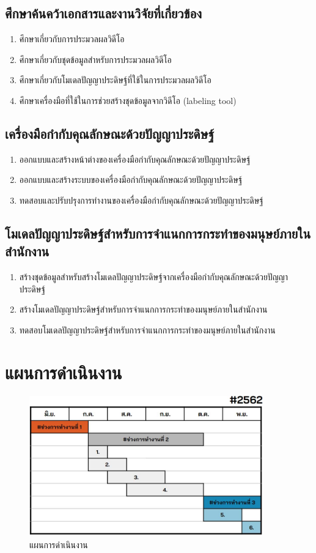 \subsection*{ศึกษาค้นคว้าเอกสารและงานวิจัยที่เกี่ยวข้อง}
\begin{enumerate}\setlength\itemsep{-0.25em}
	\item ศึกษาเกี่ยวกับการประมวลผลวิดีโอ
	\item ศึกษาเกี่ยวกับชุดข้อมูลสำหรับการประมวลผลวิดีโอ
	\item ศึกษาเกี่ยวกับโมเดลปัญญาประดิษฐ์ที่ใช้ในการประมวลผลวิดีโอ
	\item ศึกษาเครื่องมือที่ใช้ในการช่วยสร้างชุดข้อมูลจากวิดีโอ (labeling tool)
\end{enumerate}
\subsection*{เครื่องมือกำกับคุณลักษณะด้วยปัญญาประดิษฐ์}
\begin{enumerate}\setlength\itemsep{-0.25em}
	\item ออกแบบและสร้างหน้าต่างของเครื่องมือกำกับคุณลักษณะด้วยปัญญาประดิษฐ์
	\item ออกแบบและสร้างระบบของเครื่องมือกำกับคุณลักษณะด้วยปัญญาประดิษฐ์
	\item ทดสอบและปรับปรุงการทำงานของเครื่องมือกำกับคุณลักษณะด้วยปัญญาประดิษฐ์
\end{enumerate}
\subsection*{โมเดลปัญญาประดิษฐ์สำหรับการจำแนกการกระทำของมนุษย์ภายในสำนักงาน}
\begin{enumerate}\setlength\itemsep{-0.25em}
	\item สร้างชุดข้อมูลสำหรับสร้างโมเดลปัญญาประดิษฐ์จากเครื่องมือกำกับคุณลักษณะด้วยปัญญาประดิษฐ์
	\item สร้างโมเดลปัญญาประดิษฐ์สำหรับการจำแนกการกระทำของมนุษย์ภายในสำนักงาน
	\item ทดสอบโมเดลปัญญาประดิษฐ์สำหรับการจำแนกการกระทำของมนุษย์ภายในสำนักงาน
\end{enumerate}
\clearpage
\section*{แผนการดำเนินงาน}
\begin{figure}[!ht]
	\centering
	\includegraphics[width=0.9\textwidth]{chapter1/gantt_chart.jpg}
	\caption{แผนการดำเนินงาน}
	\label{tab:ganttchart}
\end{figure}
